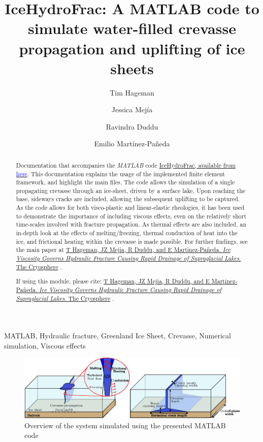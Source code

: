 \documentclass[3p]{elsarticle} %
\newcommand{\citeMe}{\href{https://doi.org/10.1016/j.cma.2023.116235}{T Hageman, JZ Mejia, R Duddu, and E {Martinez-Pa{\~n}eda}. \textit{Ice Viscosity Governs Hydraulic Fracture Causing Rapid Drainage of Supraglacial Lakes}. The Cryosphere} \citep{Hageman}}
\begin{document}
\begin{frontmatter}
\title{IceHydroFrac: A MATLAB code to simulate water-filled crevasse propagation and uplifting of ice sheets }

\author[1]{Tim Hageman }
\author[2]{Jessica Mejía}
\author[3]{Ravindra Duddu} 
\author[1]{Emilio Martínez-Pañeda}

\address[1]{Department of Engineering Science, University of Oxford, Oxford OX1 3PJ, UK}
\address[2]{Department of Geology, University at Buffalo, Buffalo, NY 14260, USA}
\address[3]{Department of Civil and Environmental Engineering, Department of Earth and Environmental Sciences, Vanderbilt University, Nashville, TN 37235, USA}

\begin{abstract}
Documentation that accompanies the \textit{MATLAB} code \href{https://github.com/T-Hageman/MATLAB_IceHydroFrac}{IceHydroFrac, available from \textcolor{blue}{here}}. This documentation explains the usage of the implemented finite element framework, and highlight the main files.  The code allows the simulation of a single propagating crevasse through an ice-sheet, driven by a surface lake. Upon reaching the base, sideways cracks are included, allowing the subsequent uplifting to be captured. As the code allows for both visco-plastic and linear-elastic rheologies, it has been used to demonstrate the importance of including viscous effects, even on the relatively short time-scales involved with fracture propagation. As thermal effects are also included, an in-depth look at the effects of melting/freezing, thermal conduction of heat into the ice, and frictional heating within the crevasse is made possible. For further findings, see the main paper at \citeMe{}. 

If using this module, please cite: \citeMe{}.
\end{abstract}

\begin{keyword}
MATLAB, Hydraulic fracture, Greenland Ice Sheet, Crevasse, Numerical simulation, Viscous effects
\end{keyword}

\end{frontmatter}

\begin{figure}
	\centering
	\includegraphics[width=16cm]{Figures/CaseOverview.eps}
	\caption{Overview of the system simulated using the presented MATLAB code}
\end{figure}
\end{document}
